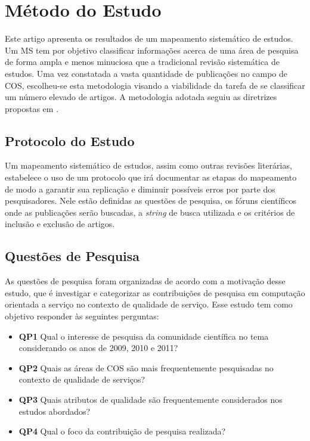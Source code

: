 
\section{Método do Estudo}\label{sec:review_method}

Este artigo apresenta os resultados de um mapeamento sistemático de estudos. Um MS tem por objetivo classificar informações acerca de uma área de pesquisa de forma ampla e menos minuciosa que a tradicional revisão sistemática de estudos. Uma vez constatada a vasta quantidade de publicações no campo de COS, escolheu-se esta metodologia visando a viabilidade da tarefa de se classificar um número elevado de artigos. A metodologia adotada seguiu as diretrizes propostas em \cite{Petersen:2008:SMS:2227115.2227123}.

\subsection{Protocolo do Estudo}

Um mapeamento sistemático de estudos, assim como outras revisões literárias, estabelece o uso de um protocolo que irá documentar as etapas do mapeamento de modo a garantir sua replicação e diminuir possíveis erros por parte dos pesquisadores. Nele estão definidas as questões de pesquisa, os fóruns científicos onde as publicações serão buscadas, a \textit{string} de busca utilizada e os critérios de inclusão e exclusão de artigos. 

\subsection{Quest\~{o}es de Pesquisa}

As questões de pesquisa foram organizadas de acordo com a motivação desse estudo, que é investigar e categorizar as contribuições de pesquisa em computação orientada a serviço no contexto de qualidade de serviço. Esse estudo tem como objetivo responder às seguintes perguntas: 

\begin{itemize}
\item {\bf QP1} Qual o interesse de pesquisa da comunidade científica no tema considerando os anos de 2009, 2010 e 2011? 
\item {\bf QP2} Quais as áreas de COS são mais frequentemente pesquisadas no contexto de qualidade de serviços?
\item {\bf QP3} Quais atributos de qualidade são frequentemente considerados nos estudos abordados?
\item {\bf QP4} Qual o foco da contribuição de pesquisa realizada?   
\end{itemize}


